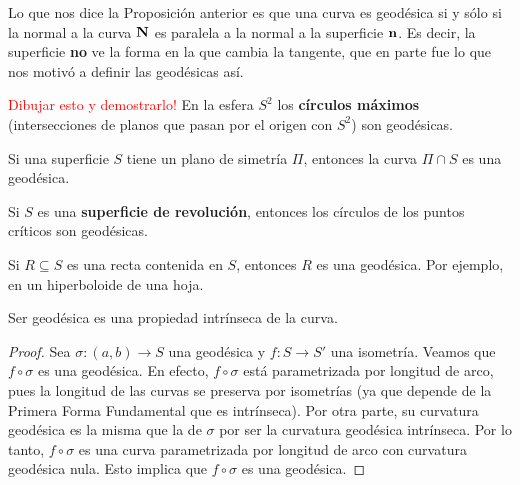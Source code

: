\begin{obs}
Lo que nos dice la Proposición anterior es que una curva es geodésica si y sólo si la normal a la curva $\operatorname{\mathbf{N}}$ es paralela a la normal a la superficie $\operatorname{\mathbf{n}}$. Es decir, la superficie \textbf{no} ve la forma en la que cambia la tangente, que en parte fue lo que nos motivó a definir las geodésicas así.
\end{obs}

\begin{ex}\textcolor{red}{Dibujar esto y demostrarlo!}
En la esfera $S^2$ los \textbf{círculos máximos} (intersecciones de planos que pasan por el origen con $S^2$) son geodésicas.

Si una superficie $S$ tiene un plano de simetría $\Pi$, entonces la curva $\Pi\cap S$ es una geodésica.

Si $S$ es una \textbf{superficie de revolución}, entonces los círculos de los puntos críticos son geodésicas.

Si $R\subseteq S$ es una recta contenida en $S$, entonces $R$ es una geodésica. Por ejemplo, en un hiperboloide de una hoja.
\end{ex}

\begin{prop}
Ser geodésica es una propiedad intrínseca de la curva.
\begin{proof}
Sea $\sigma:(a,b)\to S$ una geodésica y $f:S\to S'$ una isometría. Veamos que $f\circ\sigma$ es una geodésica. En efecto, $f\circ\sigma$ está parametrizada por longitud de arco, pues la longitud de las curvas se preserva por isometrías (ya que depende de la Primera Forma Fundamental que es intrínseca). Por otra parte, su curvatura geodésica es la misma que la de $\sigma$ por ser la curvatura geodésica intrínseca. Por lo tanto, $f\circ\sigma$ es una curva parametrizada por longitud de arco con curvatura geodésica nula. Esto implica que $f\circ\sigma$ es una geodésica.
\end{proof}
\end{prop}

